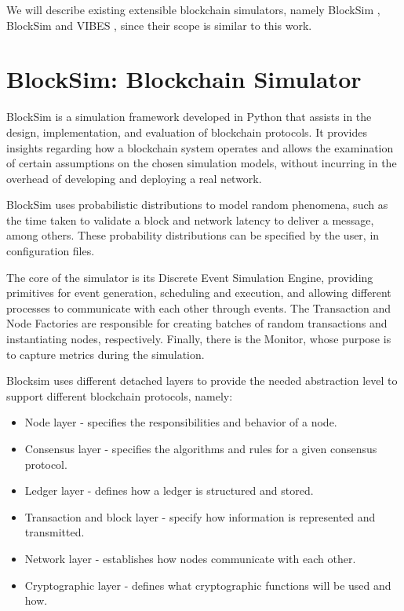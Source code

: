 We will describe existing extensible blockchain simulators, namely BlockSim \cite{blocksim1}, BlockSim \cite{blocksim2} and VIBES \cite{vibes}, since their scope is similar to this work.


\section{BlockSim: Blockchain Simulator}
\label{sec:blocksim1}

BlockSim \cite{blocksim1} is a simulation framework developed in Python that assists in the design, implementation, and evaluation of blockchain protocols. It provides insights regarding how a blockchain system operates and allows the examination of certain assumptions on the chosen simulation models, without incurring in the overhead of developing and deploying a real network.

BlockSim uses probabilistic distributions to model random phenomena, such as the time taken to validate a block and network latency to deliver a message, among others. These probability distributions can be specified by the user, in configuration files.

The core of the simulator is its Discrete Event Simulation Engine, providing primitives for event generation, scheduling and execution, and allowing different processes to communicate with each other through events. The Transaction and Node Factories are responsible for creating batches of random transactions and instantiating nodes, respectively. Finally, there is the Monitor, whose purpose is to capture metrics during the simulation.

Blocksim uses different detached layers to provide the needed abstraction level to support different blockchain protocols, namely:

\begin{itemize}
    \item Node layer - specifies the responsibilities and behavior of a node.
    \item Consensus layer - specifies the algorithms and rules for a given consensus protocol.
    \item Ledger layer - defines how a ledger is structured and stored.
    \item Transaction and block layer - specify how information is represented and transmitted.
    \item Network layer - establishes how nodes communicate with each other.
    \item Cryptographic layer - defines what cryptographic functions will be used and how.
\end{itemize}

